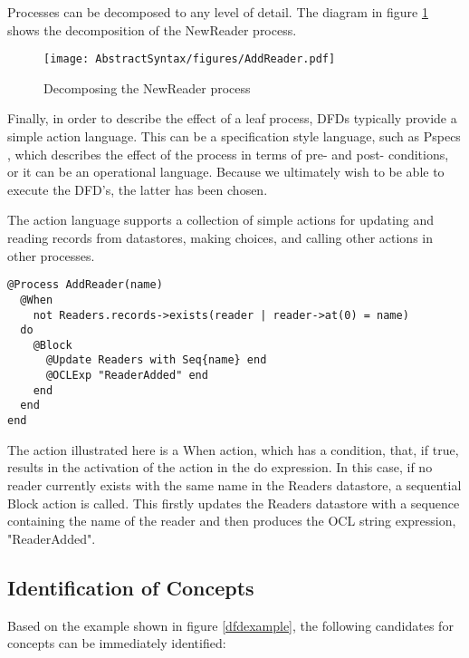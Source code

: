 Processes can be decomposed to any level of detail. The diagram in figure \ref{addreader} shows the decomposition of the NewReader process.

\begin{figure}[htb]
\begin{center}
\texttt{[image: AbstractSyntax/figures/AddReader.pdf]}
\caption{Decomposing the NewReader process}
\label{addreader}
\end{center}
\end{figure}

Finally, in order to describe the effect of a leaf process, DFDs typically provide a simple action language. This can be a specification style language, such as Pspecs \cite{}, which describes the effect of the process in terms of pre- and post- conditions, or it can be an operational language. Because we ultimately wish to be able to execute the DFD's, the latter has been chosen. 

The action language supports a collection of simple actions for updating and reading records from datastores, making choices, and calling other actions in other processes.

\small
\begin{verbatim}
@Process AddReader(name)
  @When
    not Readers.records->exists(reader | reader->at(0) = name) 
  do
    @Block
      @Update Readers with Seq{name} end
      @OCLExp "ReaderAdded" end
    end
  end
end
\end{verbatim}
\normalsize    

The action illustrated here is a When action, which has a condition, that, if true, results in the activation of the action in the do expression. In this case, if no reader currently exists with the same name in the Readers datastore, a sequential Block action is called. This firstly updates the Readers datastore with a sequence containing the name of the reader and then produces the OCL string expression, "ReaderAdded".   

\subsection{Identification of Concepts}

Based on the example shown in figure \ref{dfdexample}, the following candidates for concepts can be immediately identified:

